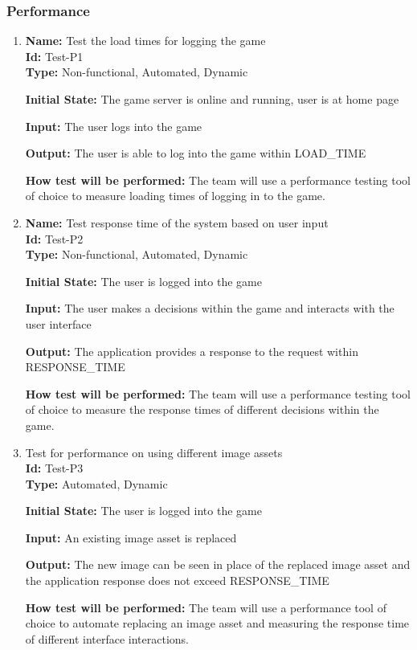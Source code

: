 \documentclass[12pt, titlepage]{article}
\begin{document}
\subsubsection{Performance}
\begin{enumerate}
    \item{\textbf{Name: }Test the load times for logging the game\\}\label{Test-P1}
    \textbf{Id: }Test-P1\\
    
    \textbf{Type:} Non-functional, Automated, Dynamic
    					
    \textbf{Initial State: }The game server is online and running, user is at home page
    					
    \textbf{Input:} The user logs into the game
    					
   \textbf{Output: }The user is able to log into the game within LOAD\_TIME
    					
   \textbf{How test will be performed:} The team will use a performance testing tool of choice to measure loading times of logging in to the game.
    
    
    \item{\textbf{Name: }Test response time of the system based on user input\\}\label{Test-P2}
     \textbf{Id: }Test-P2\\
    
    \textbf{Type: }Non-functional, Automated, Dynamic
    					
    \textbf{Initial State:} The user is logged into the game
    					
    \textbf{Input:} The user makes a decisions within the game and interacts with the user interface
    					
    \textbf{Output:} The application provides a response to the request within RESPONSE\_TIME
    					
    \textbf{How test will be performed:} The team will use a performance testing tool of choice to measure the response times of different decisions within the game.


\item{Test for performance on using different image assets \\}\label{Test-P3}
\textbf{Id: }Test-P3\\
\textbf{Type:} Automated, Dynamic
					
\textbf{Initial State:} The user is logged into the game
					
\textbf{Input: }An existing image asset is replaced
					
\textbf{Output:} The new image can be seen in place of the replaced image asset and the application response does not exceed RESPONSE\_TIME
					
\textbf{How test will be performed: }The team will use a performance tool of choice to automate replacing an image asset and measuring the response time of different interface interactions.
\end{enumerate}
\end{document}
